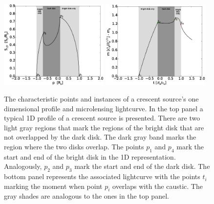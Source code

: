 \documentclass[usenatbib]{mn2e}
\begin{document}
\begin{figure}
\centering
        \includegraphics[width = 0.48\textwidth]{figures/ch_points.eps}
        \includegraphics[width = 0.48\textwidth]{figures/ch_instances.eps}
\caption{\label{fig:char_points} The characteristic points and
  instances of a crescent source's one dimensional profile and
  microlensing lightcurve.  In the top panel a typical 1D profile of a
  crescent source is presented.  There are two light gray regions that
  mark the regions of the bright disk that are not overlapped by the
  dark disk. The dark gray band marks the region where the two disks
  overlap. The points $p_1$ and $p_4$ mark the start and end of the
  bright disk in the 1D representation. Analogously, $p_2$ and $p_3$
  mark the start and end of the dark disk.  The bottom panel
  represents the associated lightcurve with the points $t_i$ marking
  the moment when point $p_i$ overlaps with the caustic.  The gray
  shades are analogous to the ones in the top panel.  }
\end{figure}
\end{document}
